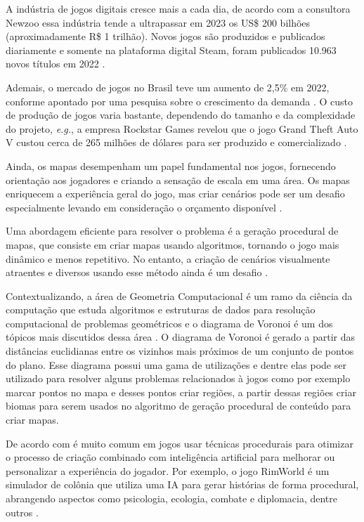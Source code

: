 A indústria de jogos digitais cresce mais a cada dia, de acordo com a consultora Newzoo \space\cite{quanto_games_vao_movimentar} essa indústria tende a ultrapassar em 2023 os US\$ 200 bilhões (aproximadamente R\$ 1 trilhão). Novos jogos são produzidos e publicados diariamente e somente na plataforma digital Steam, foram publicados 10.963 novos títulos em 2022\space
\cite{numero_de_jogos_publicados_na_steam}.

Ademais, o mercado de jogos no Brasil teve um aumento de 2,5\% em 2022, conforme apontado por uma pesquisa sobre o crescimento da demanda \space \cite{pesquisa_games_brasil}. O custo de produção de jogos varia bastante, dependendo do tamanho e da complexidade do projeto, \emph{e.g.}, a empresa Rockstar Games revelou que o jogo Grand Theft Auto V custou cerca de 265 milhões de dólares para ser produzido e comercializado \space
\cite{gta_quanto_custou}.

Ainda, os mapas desempenham um papel fundamental nos jogos, fornecendo orientação aos jogadores e criando a sensação de escala em uma área. Os mapas enriquecem a experiência geral do jogo, mas criar cenários pode ser um desafio especialmente levando em consideração o orçamento disponível \cite{video-game-maps}.

Uma abordagem eficiente para resolver o problema é a geração procedural de mapas, que consiste em criar mapas usando algoritmos, tornando o jogo mais dinâmico e menos repetitivo. No entanto, a criação de cenários visualmente atraentes e diversos usando esse método ainda é um desafio \cite{geracao_procedural_jogos_2d}.

Contextualizando, a área de Geometria Computacional é um ramo da ciência da computação que estuda algoritmos e estruturas de dados para resolução computacional de problemas geométricos e o diagrama de Voronoi é um dos tópicos mais discutidos dessa 
área \cite{diagrama_voronoi_jogos}. O diagrama de Voronoi é gerado a partir das distâncias euclidianas entre os vizinhos mais próximos de um conjunto de pontos do plano\space\cite{diagrama_de_voronoi:_uma_exploracao_nas_distancias_euclidiana_e_do_taxi}. Esse diagrama possui uma gama de utilizações e dentre elas pode ser utilizado para resolver alguns problemas relacionados à jogos como por exemplo marcar pontos no mapa e desses pontos criar regiões, a partir dessas regiões criar biomas para serem usados no algoritmo de geração procedural de conteúdo para criar mapas.

De acordo com  é muito comum em jogos usar técnicas procedurais para otimizar o processo de criação combinado com inteligência artificial para melhorar ou personalizar a experiência do jogador. Por exemplo, o jogo RimWorld é um simulador de colônia que utiliza uma IA para gerar histórias de forma procedural, abrangendo aspectos como psicologia, ecologia, combate e diplomacia, dentre outros \cite{jogo_procedural}.

